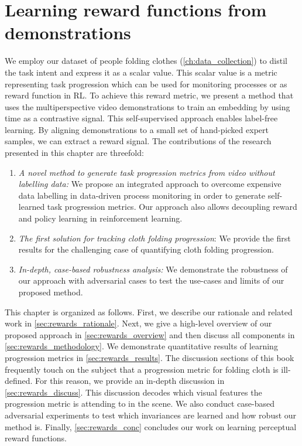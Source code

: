 \documentclass[\home/main.tex]{subfiles}
\begin{document}

\chapter{Learning reward functions from demonstrations}\label{ch:reward_functions}

We employ our dataset of people folding clothes (\cref{ch:data_collection}) to distil the task intent and express it as a scalar value. This scalar value is a metric representing task progression which can be used for monitoring processes or as reward function in \gls{RL}. To achieve this reward metric, we present a method that uses the multiperspective video demonstrations to train an embedding by using time as a contrastive signal. This self-supervised approach enables label-free learning. By aligning demonstrations to a small set of hand-picked expert samples, we can extract a reward signal. The contributions of the research presented in this chapter are threefold:
\begin{enumerate}
    \item \emph{A novel method to generate task progression metrics from video without labelling data:} We propose an integrated approach to overcome expensive data labelling in data-driven process monitoring in order to generate self-learned task progression metrics. Our approach also allows decoupling reward and policy learning in reinforcement learning.
    \item \emph{The first solution for tracking cloth folding progression}: We provide the first results for the challenging case of quantifying cloth folding progression.
    \item \emph{In-depth, case-based robustness analysis:} We demonstrate the robustness of our approach with adversarial cases to test the use-cases and limits of our proposed method.
\end{enumerate}

This chapter is organized as follows.
First, we describe our rationale and related work in \cref{sec:rewards_rationale}. Next, we give a high-level overview of our proposed approach in \cref{sec:rewards_overview} and then discuss all components in \cref{sec:rewards_methodology}. We demonstrate quantitative results of learning progression metrics in \cref{sec:rewards_results}. The discussion sections of this book frequently touch on the subject that a progression metric for folding cloth is ill-defined. For this reason, we provide an in-depth discussion in \cref{sec:rewards_discuss}. This discussion decodes which visual features the progression metric is attending to in the scene. We also conduct case-based adversarial experiments to test which invariances are learned and how robust our method is. Finally, \cref{sec:rewards_conc} concludes our work on learning perceptual reward functions.
\end{document}
